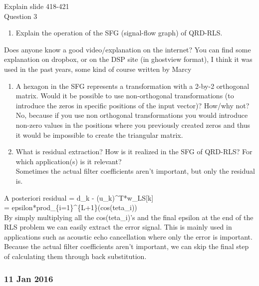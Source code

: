 \documentclass[
  a4paper,
  ,captions=tableheading
]{scrartcl}
\providecommand{\tightlist}{%
  \setlength{\itemsep}{0pt}\setlength{\parskip}{0pt}}
\begin{document}
Explain slide 418-421\\
Question 3

\begin{enumerate}
\def\labelenumi{\arabic{enumi}.}
\tightlist
\item
  Explain the operation of the SFG (signal-flow graph) of QRD-RLS.
\end{enumerate}

Does anyone know a good video/explanation on the internet? You can find
some explanation on dropbox, or on the DSP site (in ghostview format), I
think it was used in the past years, some kind of course written by
Marcy

\begin{enumerate}
\def\labelenumi{\arabic{enumi}.}
\setcounter{enumi}{1}
\tightlist
\item
  A hexagon in the SFG represents a transformation with a 2-by-2
  orthogonal matrix. Would it be possible to use non-orthogonal
  transformations (to introduce the zeros in specific positions of the
  input vector)? How/why not?\\
  No, because if you use non orthogonal transformations you would
  introduce non-zero values in the positions where you previously
  created zeros and thus it would be impossible to create the triangular
  matrix.\\
\item
  What is residual extraction? How is it realized in the SFG of QRD-RLS?
  For which application(s) is it relevant?\\
  Sometimes the actual filter coefficients aren't important, but only
  the residual is.
\end{enumerate}

A posteriori residual = d\_k - (u\_k)\^{}T*w\_LS{[}k{]}\\
= epsilon*prod\_\{i=1\}\^{}\{L+1\}(cos(teta\_i))\\
By simply multiplying all the cos(teta\_i)'s and the final epsilon at
the end of the RLS problem we can easily extract the error signal. This
is mainly used in applications such as acoustic echo cancellation where
only the error is important. Because the actual filter coefficients
aren't important, we can skip the final step of calculating them through
back substitution.

\subsubsection{\texorpdfstring{\textbf{11 Jan
2016}}{11 Jan 2016}}\label{jan-2016-2}
\end{document}
